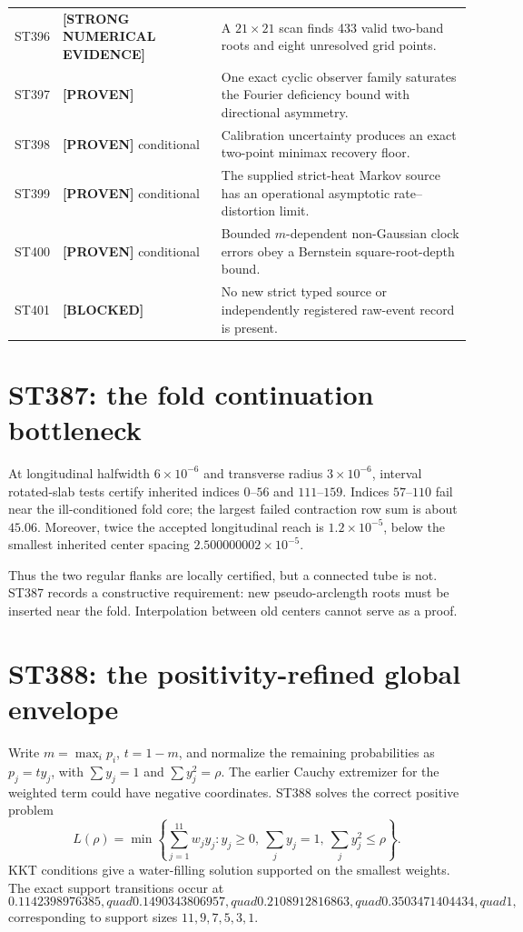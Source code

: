 \documentclass[11pt,a4paper]{article}
\newcommand{\Proven}{\textcolor{green!40!black}{\textbf{[PROVEN]}}}
\newcommand{\Evidence}{\textcolor{orange!80!black}{\textbf{[STRONG NUMERICAL EVIDENCE]}}}
\newcommand{\Blocked}{\textcolor{red!65!black}{\textbf{[BLOCKED]}}}
\begin{document}
\begin{longtable}{>{\raggedright\arraybackslash}p{}>{\raggedright\arraybackslash}p{}>{\raggedright\arraybackslash}p{}}
ST396&\Evidence&A $21\times21$ scan finds 433 valid two-band roots and eight unresolved grid points.\\
ST397&\Proven&One exact cyclic observer family saturates the Fourier deficiency bound with directional asymmetry.\\
ST398&\Proven{} conditional&Calibration uncertainty produces an exact two-point minimax recovery floor.\\
ST399&\Proven{} conditional&The supplied strict-heat Markov source has an operational asymptotic rate--distortion limit.\\
ST400&\Proven{} conditional&Bounded $m$-dependent non-Gaussian clock errors obey a Bernstein square-root-depth bound.\\
ST401&\Blocked&No new strict typed source or independently registered raw-event record is present.\\
\bottomrule
\end{longtable}
\normalsize

\section{ST387: the fold continuation bottleneck}

At longitudinal halfwidth $6\times10^{-6}$ and transverse radius
$3\times10^{-6}$, interval rotated-slab tests certify inherited indices
$0$--$56$ and $111$--$159$.  Indices $57$--$110$ fail near the ill-conditioned
fold core; the largest failed contraction row sum is about $45.06$.  Moreover,
twice the accepted longitudinal reach is $1.2\times10^{-5}$, below the smallest
inherited center spacing $2.500000002\times10^{-5}$.

Thus the two regular flanks are locally certified, but a connected tube is not.
ST387 records a constructive requirement: new pseudo-arclength roots must be inserted
near the fold.  Interpolation between old centers cannot serve as a proof.

\section{ST388: the positivity-refined global envelope}

Write $m=\max_i p_i$, $t=1-m$, and normalize the remaining probabilities as
$p_j=t y_j$, with $\sum y_j=1$ and $\sum y_j^2=\rho$.  The earlier Cauchy
extremizer for the weighted term could have negative coordinates.  ST388 solves the
correct positive problem
\[
 L(\rho)=\min\left\{\sum_{j=1}^{11}w_jy_j:
 y_j\ge0,\ \sum_jy_j=1,\ \sum_jy_j^2\le\rho\right\}.
\]
KKT conditions give a water-filling solution supported on the smallest weights.
The exact support transitions occur at
\[
 0.1142398976385,quad0.1490343806957,quad
 0.2108912816863,quad0.3503471404434,quad1,
\]
corresponding to support sizes $11,9,7,5,3,1$.
\end{document}
